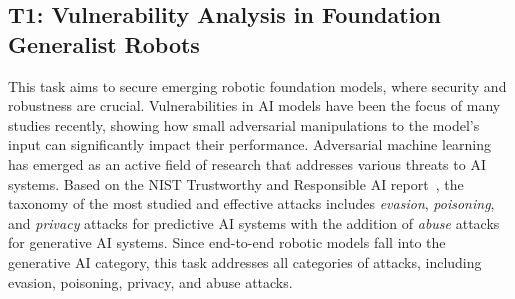 \subsection{T1: Vulnerability Analysis in Foundation Generalist Robots}

This task aims to secure emerging robotic foundation models, where security and robustness are crucial.
Vulnerabilities in AI models have been the focus of many studies recently, showing how small adversarial manipulations to the model's input can significantly impact their performance.
Adversarial machine learning has emerged as an active field of research that addresses various threats to AI systems.
Based on the NIST Trustworthy and Responsible AI report~\cite{NIST_AI_100_2e2023}, the taxonomy of the most studied and effective attacks includes \emph{evasion}, \emph{poisoning}, and \emph{privacy} attacks for predictive AI systems with the addition of \emph{abuse} attacks for generative AI systems.
Since end-to-end robotic models fall into the generative AI category, this task addresses all categories of attacks, including evasion, poisoning, privacy, and abuse attacks.







